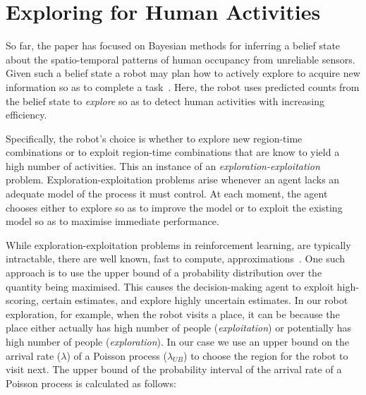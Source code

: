 
\section{Exploring for Human Activities}
\label{sec:exploration}

So far, the paper has focused on Bayesian methods for inferring a belief state about the spatio-temporal patterns of human occupancy from unreliable sensors. Given such a belief state a robot may plan how to actively explore to acquire new information so as to complete a task~\cite{hanheide2017robot, sridharan2019reba}. Here, the robot uses predicted counts from the belief state to \emph{explore} so as to detect human activities with increasing efficiency. 

Specifically, the robot's choice is whether to explore new region-time combinations or to exploit region-time combinations that are know to yield a high number of activities. This an instance of an \emph{exploration-exploitation} problem. Exploration-exploitation problems arise whenever an agent lacks an adequate model of the process it must control. At each moment, the agent chooses either to explore so as to improve the model or to exploit the existing model so as to maximise immediate performance. 

While exploration-exploitation problems in reinforcement learning, are typically intractable, there are well known, fast to compute, approximations~\cite{wyatt1998exploration, 1413255, AUDIBERT20091876}. One such approach is to use the upper bound of a probability distribution over the quantity being maximised. This causes the decision-making agent to exploit high-scoring, certain estimates, and explore highly uncertain estimates. In our robot exploration, for example, when the robot visits a place, it can be because the place either actually has high number of people (\textit{exploitation}) or potentially has high number of people (\textit{exploration}). In our case we use an upper bound on the arrival rate ($\lambda$) of a Poisson process ($\lambda_{UB}$) to choose the region for the robot to visit next. The upper bound of the probability interval of the arrival rate of a Poisson process is calculated as follows:


